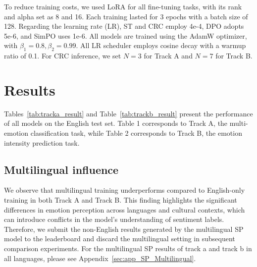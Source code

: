 \documentclass[11pt]{article}
\begin{document}

To reduce training costs, we used LoRA for all fine-tuning tasks, with its rank and alpha set as 8 and 16. Each training lasted for 3 epochs with a batch size of 128. Regarding the learning rate (LR), ST and CRC employ 4e-4, DPO adopts 5e-6, and SimPO uses 1e-6. All models are trained using the AdamW optimizer, with $\beta_1=0.8, \beta_2=0.99$. All LR scheduler employs cosine decay with a warmup ratio of 0.1. For CRC inference, we set $N=3$ for Track A and $N=7$ for Track B.

\section{Results}


Tables~\ref{tab:tracka_result} and Table~\ref{tab:trackb_result} present the performance of all models on the English test set. Table 1 corresponds to Track A, the multi-emotion classification task, while Table 2 corresponds to Track B, the emotion intensity prediction task.

\subsection{Multilingual influence}


We observe that multilingual training underperforms compared to English-only training in both Track A and Track B. This finding highlights the significant differences in emotion perception across languages and cultural contexts, which can introduce conflicts in the model’s understanding of sentiment labels. Therefore, we submit the non-English results generated by the multilingual SP model to the leaderboard and discard the multilingual setting in subsequent comparison experiments. For the multilingual SP results of track a and track b in all languages, please see Appendix~\ref{sec:app_SP_Multilingual}.
\end{document}
